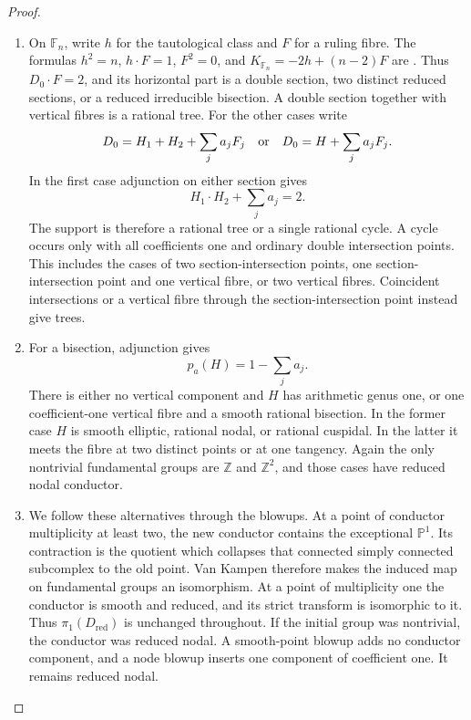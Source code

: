 \begin{proof}
\begin{enumerate}[label={$\langle1\rangle$\arabic*.},leftmargin=*]
\item On $\mathbb F_n$, write $h$ for the tautological class
and $F$ for a ruling fibre. The formulas
$h^2=n$, $h\cdot F=1$, $F^2=0$, and
$K_{\mathbb F_n}=-2h+(n-2)F$ are
\cite[III.18, pp.~46--47; IV.1, pp.~53--54]{Beauville1978}.
Thus $D_0\cdot F=2$, and its horizontal part is a double
section, two distinct reduced sections, or a reduced
irreducible bisection. A double section together with
vertical fibres is a rational tree. For the other cases
write
\[
 D_0=H_1+H_2+\sum_j a_jF_j
 \quad\hbox{or}\quad
 D_0=H+\sum_j a_jF_j.
\]
In the first case adjunction on either section gives
\[
 H_1\cdot H_2+\sum_j a_j=2.
\]
The support is therefore a rational tree or a single
rational cycle. A cycle occurs only with all coefficients
one and ordinary double intersection points. This
includes the cases of two section-intersection points,
one section-intersection point and one vertical fibre,
or two vertical fibres. Coincident intersections or a
vertical fibre through the section-intersection point
instead give trees.

\item For a bisection, adjunction gives
\[
 p_a(H)=1-\sum_j a_j.
\]
There is either no vertical component and $H$ has
arithmetic genus one, or one coefficient-one vertical
fibre and a smooth rational bisection. In the former
case $H$ is smooth elliptic, rational nodal, or rational
cuspidal. In the latter it meets the fibre at two distinct
points or at one tangency. Again the only nontrivial
fundamental groups are $\mathbb Z$ and $\mathbb Z^2$,
and those cases have reduced nodal conductor.

\item We follow these alternatives through the blowups. At a
point of conductor multiplicity at least two, the new
conductor contains the exceptional $\mathbb P^1$.
Its contraction is the quotient which collapses that
connected simply connected subcomplex to the old
point. Van Kampen therefore makes the induced map on
fundamental groups an isomorphism. At a point of
multiplicity one the conductor is smooth and reduced,
and its strict transform is isomorphic to it. Thus
$\pi_1(D_{\mathrm{red}})$ is unchanged throughout.
If the initial group was nontrivial, the conductor was
reduced nodal. A smooth-point blowup adds no conductor
component, and a node blowup inserts one component of
coefficient one. It remains reduced nodal.


\end{enumerate}
\end{proof}
